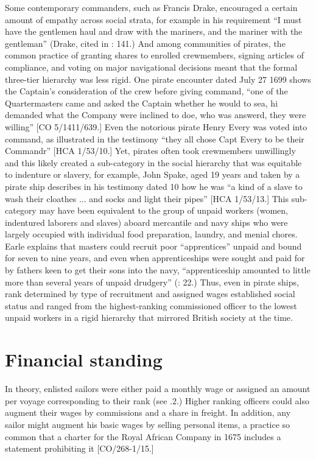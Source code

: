 Some contemporary commanders, such as Francis Drake, encouraged a certain amount of empathy across social strata, for example in his requirement “I must have the gentlemen haul and draw with the mariners, and the mariner with the gentleman” (Drake, cited in \citealt{Bicheno2012}: 141.) And among communities of pirates, the common practice of granting shares to enrolled crewmembers, signing articles of compliance, and voting on major navigational decisions meant that the formal three-tier hierarchy was less rigid. One pirate encounter dated July 27 1699 shows the Captain’s consideration of the crew before giving command, “one of the Quartermasters came and asked the Captain whether he would to sea, hi demanded what the Company were inclined to doe, who was answerd, they were willing” [CO 5/1411/639.] Even the notorious pirate Henry Every was voted into command, as illustrated in the testimony “they all chose Capt Every to be their Commandr” [HCA 1/53/10.] Yet, pirates often took crewmembers unwillingly and this likely created a sub-category in the social hierarchy that was equitable to indenture or slavery, for example, John Spake, aged 19 years and taken by a pirate ship describes in his testimony dated 10 \citealt{September1696} how he was “a kind of a slave to wash their cloathes ... and socks and light their pipes” [HCA 1/53/13.] This sub-category may have been equivalent to the group of unpaid workers (women, indentured laborers and slaves) aboard mercantile and navy ships who were largely occupied with individual food preparation, laundry, and menial chores.  Earle explains that masters could recruit poor “apprentices” unpaid and bound for seven to nine years, and even when apprenticeships were sought and paid for by fathers keen to get their sons into the navy, “apprenticeship amounted to little more than several years of unpaid drudgery” (\citealt{Earle1998}: 22.) Thus, even in pirate ships, rank determined by type of recruitment and assigned wages established social status and ranged from the highest-ranking commissioned officer to the lowest unpaid workers in a rigid hierarchy that mirrored British society at the time. 

\section{\textbf{Financial} \textbf{standing}}%

In theory, enlisted sailors were either paid a monthly wage or assigned an amount per voyage corresponding to their rank (see .2.) Higher ranking officers could also augment their wages by commissions and a share in freight. In addition, any sailor might augment his basic wages by selling personal items, a practice so common that a charter for the Royal African Company in 1675 includes a statement prohibiting it [CO/268-1/15.]  

